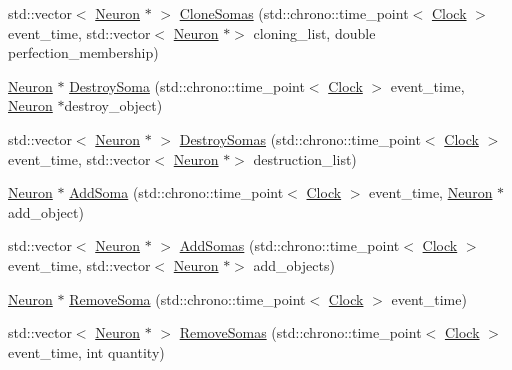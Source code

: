 \begin{DoxyCompactItemize}
\item 
std\+::vector$<$ \mbox{\hyperlink{class_neuron}{Neuron}} $\ast$ $>$ \mbox{\hyperlink{class_neuron_a508841fa635a6e89609c514a79ea59da}{Clone\+Somas}} (std\+::chrono\+::time\+\_\+point$<$ \mbox{\hyperlink{universe_8h_a0ef8d951d1ca5ab3cfaf7ab4c7a6fd80}{Clock}} $>$ event\+\_\+time, std\+::vector$<$ \mbox{\hyperlink{class_neuron}{Neuron}} $\ast$$>$ cloning\+\_\+list, double perfection\+\_\+membership)
\item 
\mbox{\hyperlink{class_neuron}{Neuron}} $\ast$ \mbox{\hyperlink{class_neuron_a6ff7510f73e29c31003b016bdcb4a70e}{Destroy\+Soma}} (std\+::chrono\+::time\+\_\+point$<$ \mbox{\hyperlink{universe_8h_a0ef8d951d1ca5ab3cfaf7ab4c7a6fd80}{Clock}} $>$ event\+\_\+time, \mbox{\hyperlink{class_neuron}{Neuron}} $\ast$destroy\+\_\+object)
\item 
std\+::vector$<$ \mbox{\hyperlink{class_neuron}{Neuron}} $\ast$ $>$ \mbox{\hyperlink{class_neuron_a32b3a98eec58dc66481a2b877a7592cb}{Destroy\+Somas}} (std\+::chrono\+::time\+\_\+point$<$ \mbox{\hyperlink{universe_8h_a0ef8d951d1ca5ab3cfaf7ab4c7a6fd80}{Clock}} $>$ event\+\_\+time, std\+::vector$<$ \mbox{\hyperlink{class_neuron}{Neuron}} $\ast$$>$ destruction\+\_\+list)
\item 
\mbox{\hyperlink{class_neuron}{Neuron}} $\ast$ \mbox{\hyperlink{class_neuron_a6198fa352056e3bbe1e979adf088b900}{Add\+Soma}} (std\+::chrono\+::time\+\_\+point$<$ \mbox{\hyperlink{universe_8h_a0ef8d951d1ca5ab3cfaf7ab4c7a6fd80}{Clock}} $>$ event\+\_\+time, \mbox{\hyperlink{class_neuron}{Neuron}} $\ast$add\+\_\+object)
\item 
std\+::vector$<$ \mbox{\hyperlink{class_neuron}{Neuron}} $\ast$ $>$ \mbox{\hyperlink{class_neuron_a78a0f48a669b6ea20280829304e51de2}{Add\+Somas}} (std\+::chrono\+::time\+\_\+point$<$ \mbox{\hyperlink{universe_8h_a0ef8d951d1ca5ab3cfaf7ab4c7a6fd80}{Clock}} $>$ event\+\_\+time, std\+::vector$<$ \mbox{\hyperlink{class_neuron}{Neuron}} $\ast$$>$ add\+\_\+objects)
\item 
\mbox{\hyperlink{class_neuron}{Neuron}} $\ast$ \mbox{\hyperlink{class_neuron_a4f8c2f0c1b294493a7c581a7f46c2863}{Remove\+Soma}} (std\+::chrono\+::time\+\_\+point$<$ \mbox{\hyperlink{universe_8h_a0ef8d951d1ca5ab3cfaf7ab4c7a6fd80}{Clock}} $>$ event\+\_\+time)
\item 
std\+::vector$<$ \mbox{\hyperlink{class_neuron}{Neuron}} $\ast$ $>$ \mbox{\hyperlink{class_neuron_a976b1bab63d0bd21b1c8c8e1cfbd17fe}{Remove\+Somas}} (std\+::chrono\+::time\+\_\+point$<$ \mbox{\hyperlink{universe_8h_a0ef8d951d1ca5ab3cfaf7ab4c7a6fd80}{Clock}} $>$ event\+\_\+time, int quantity)
$$
\end{DoxyCompactItemize}
